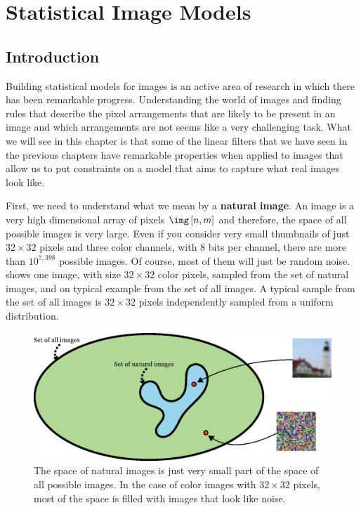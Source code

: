 

\chapter{Statistical Image Models}
\label{chapter:stat_image_models}


\section{Introduction}

Building statistical models for images is an active area of research in which there has been remarkable progress. Understanding the world of images and finding rules that describe the pixel arrangements that are likely to be present in an image and which arrangements are not seems like a very challenging task. What we will see in this chapter is that some of the linear filters that we have seen in the previous chapters have remarkable properties when applied to images that allow us to put constraints on a model that aims to capture what real images look like. 

First, we need to understand what we mean by a {\bf natural image}. An image is a very high dimensional array of pixels $\img \left[n,m\right]$ and therefore, the space of all possible images is very large. Even if you consider very small thumbnails of just $32\times32$ pixels and three color channels, with 8 bits per channel, there are more than $10^{7,398}$ possible images. Of course, most of them will just be random noise. \Fig{\ref{fig:spaces_real_images}} shows one image, with size $32\times32$ color pixels, sampled from the set of natural images, and on typical example from the set of all images. A typical sample from the set of all images is $32\times32$ pixels independently sampled from a uniform distribution. 

\begin{figure}
\centerline{
\includegraphics[width=.8\linewidth]{figures/statistical_image_models/spaces_real_images.eps}
} 
\caption{The space of natural images is just very small part of the space of all possible images. In the case of color images with $32\times32$ pixels, most of the space is filled with images that look like noise.} 
\label{fig:spaces_real_images}
\end{figure}


